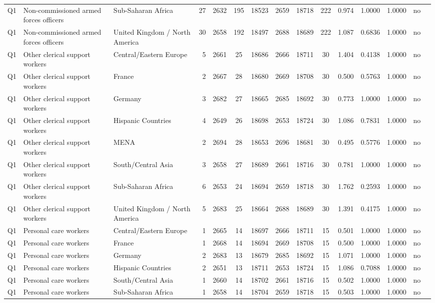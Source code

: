 \begin{longtable}{lllrcccccccccll}
Q1 & Non-commissioned armed forces officers & Sub-Saharan Africa & 27 & 2632 & 195 & 18523 & 2659 & 18718 & 222 & 0.974 & 1.0000 & 1.0000 & no \\
Q1 & Non-commissioned armed forces officers & United Kingdom / North America & 30 & 2658 & 192 & 18497 & 2688 & 18689 & 222 & 1.087 & 0.6836 & 1.0000 & no \\
Q1 & Other clerical support workers & Central/Eastern Europe & 5 & 2661 & 25 & 18686 & 2666 & 18711 & 30 & 1.404 & 0.4138 & 1.0000 & no \\
Q1 & Other clerical support workers & France & 2 & 2667 & 28 & 18680 & 2669 & 18708 & 30 & 0.500 & 0.5763 & 1.0000 & no \\
Q1 & Other clerical support workers & Germany & 3 & 2682 & 27 & 18665 & 2685 & 18692 & 30 & 0.773 & 1.0000 & 1.0000 & no \\
Q1 & Other clerical support workers & Hispanic Countries & 4 & 2649 & 26 & 18698 & 2653 & 18724 & 30 & 1.086 & 0.7831 & 1.0000 & no \\
Q1 & Other clerical support workers & MENA & 2 & 2694 & 28 & 18653 & 2696 & 18681 & 30 & 0.495 & 0.5776 & 1.0000 & no \\
Q1 & Other clerical support workers & South/Central Asia & 3 & 2658 & 27 & 18689 & 2661 & 18716 & 30 & 0.781 & 1.0000 & 1.0000 & no \\
Q1 & Other clerical support workers & Sub-Saharan Africa & 6 & 2653 & 24 & 18694 & 2659 & 18718 & 30 & 1.762 & 0.2593 & 1.0000 & no \\
Q1 & Other clerical support workers & United Kingdom / North America & 5 & 2683 & 25 & 18664 & 2688 & 18689 & 30 & 1.391 & 0.4175 & 1.0000 & no \\
Q1 & Personal care workers & Central/Eastern Europe & 1 & 2665 & 14 & 18697 & 2666 & 18711 & 15 & 0.501 & 1.0000 & 1.0000 & no \\
Q1 & Personal care workers & France & 1 & 2668 & 14 & 18694 & 2669 & 18708 & 15 & 0.500 & 1.0000 & 1.0000 & no \\
Q1 & Personal care workers & Germany & 2 & 2683 & 13 & 18679 & 2685 & 18692 & 15 & 1.071 & 1.0000 & 1.0000 & no \\
Q1 & Personal care workers & Hispanic Countries & 2 & 2651 & 13 & 18711 & 2653 & 18724 & 15 & 1.086 & 0.7088 & 1.0000 & no \\
Q1 & Personal care workers & South/Central Asia & 1 & 2660 & 14 & 18702 & 2661 & 18716 & 15 & 0.502 & 1.0000 & 1.0000 & no \\
Q1 & Personal care workers & Sub-Saharan Africa & 1 & 2658 & 14 & 18704 & 2659 & 18718 & 15 & 0.503 & 1.0000 & 1.0000 & no \\

\end{longtable}
